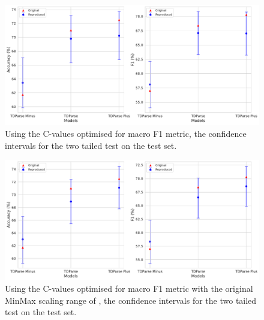 \begin{figure}[!h]
    \centering
    \includegraphics[scale=0.42]{images/reproducibility/wang/TDParse_F1_C_value_Dong.pdf}
    \caption{Using the C-values optimised for macro F1 metric, the confidence intervals for the two tailed test on the \citet{dong-etal-2014-adaptive} test set.}
    \label{fig:repro_wang_TDParse_Dong_macro_f1_c_values}
\end{figure}

\begin{figure}[!h]
    \centering
    \includegraphics[scale=0.42]{images/reproducibility/wang/TDParse_F1_C_value_alt_scale_Dong.pdf}
    \caption{Using the C-values optimised for macro F1 metric with the original MinMax scaling range of \citet{wang-etal-2017-tdparse}, the confidence intervals for the two tailed test on the \citet{dong-etal-2014-adaptive} test set.}
    \label{fig:repro_wang_TDParse_Dong_alt_scaling_macro_f1_c_values}
\end{figure}

